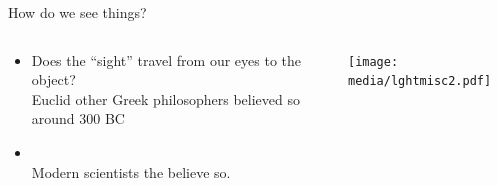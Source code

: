 \begin{frame}{How do we see things?}
  \begin{columns}
    \begin{column}{0.7\textwidth}
      \begin{itemize}
        \item
          Does the ``sight'' travel from our eyes to the object?\\
           {\color{red}Euclid other Greek philosophers believed so around 300 BC}
       \item
         \color{black}{or the ``light'' travels from the object to our eyes?}\\
          {\color{red}Modern scientists the believe so.}
      \end{itemize}
    \end{column}
    \hspace{-2cm}
    \begin{column}{0.3\textwidth}
      \centering
        \texttt{[image: media/lghtmisc2.pdf]}
    \end{column}
  \end{columns}
\end{frame}

% 

